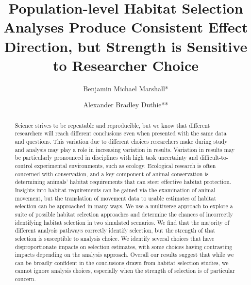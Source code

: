 \documentclass[10pt,a4paper]{article}
\begin{document}
\pagestyle{fancy}

\title{Population-level Habitat Selection Analyses Produce Consistent Effect Direction, but Strength is Sensitive to Researcher Choice}
\author[1]{Benjamin Michael Marshall*}
\author[1]{Alexander Bradley Duthie**}


\maketitle
\thispagestyle{fancy}

\begin{abstract}

Science strives to be repeatable and reproducible, but we know that different researchers will reach different conclusions even when presented with the same data and questions. This variation due to different choices researchers make during study and analysis may play a role in increasing variation in results. Variation in results may be particularly pronounced in disciplines with high task uncertainty and difficult-to-control experimental environments, such as ecology. Ecological research is often concerned with conservation, and a key component of animal conservation is determining animals' habitat requirements that can steer effective habitat protection. Insights into habitat requirements can be gained via the examination of animal movement, but the translation of movement data to usable estimates of habitat selection can be approached in many ways. We use a multiverse approach to explore a suite of possible habitat selection approaches and determine the chances of incorrectly identifying habitat selection in two simulated scenarios. We find that the majority of different analysis pathways correctly identify selection, but the strength of that selection is susceptible to analysis choice. We identify several choices that have disproportionate impacts on selection estimates, with some choices having contrasting impacts depending on the analysis approach. Overall our results suggest that while we can be broadly confident in the conclusions drawn from habitat selection studies, we cannot ignore analysis choices, especially when the strength of selection is of particular concern.

\end{abstract}
\end{document}
